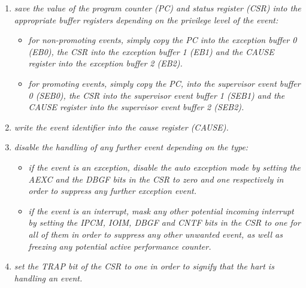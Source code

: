         \begin{enumerate}

            \item \textit{save the value of the program counter (PC) and status register (CSR) into the appropriate buffer registers depending on the privilege level of the event:}

                \begin{itemize}

                    \item \textit{for non-promoting events, simply copy the PC into the exception buffer 0 (EB0), the CSR into the exception buffer 1 (EB1) and the CAUSE register into the exception buffer 2 (EB2).}

                    \item \textit{for promoting events, simply copy the PC, into the supervisor event buffer 0 (SEB0), the CSR into the supervisor event buffer 1 (SEB1) and the CAUSE register into the supervisor event buffer 2 (SEB2).}

                \end{itemize}

            \item \textit{write the event identifier into the cause register (CAUSE).}

            \item \textit{disable the handling of any further event depending on the type:}

                \begin{itemize}

                    \item \textit{if the event is an exception, disable the auto exception mode by setting the AEXC and the DBGF bits in the CSR to zero and one respectively in order to suppress any further exception event.}

                    \item \textit{if the event is an interrupt, mask any other potential incoming interrupt by setting the IPCM, IOIM, DBGF and CNTF bits in the CSR to one for all of them in order to suppress any other unwanted event, as well as freezing any potential active performance counter.}

                \end{itemize}

            \item \textit{set the TRAP bit of the CSR to one in order to signify that the hart is handling an event.}


\end{enumerate}
